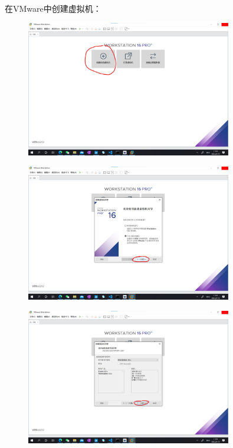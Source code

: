 \documentclass[UTF8]{ctexart}
\begin{document}
    在VMware中创建虚拟机：
    \begin{figure}[H]
        \centering
        \includegraphics[width=0.8\textwidth]{assets/u2.png}
    \end{figure}
    \begin{figure}[H]
        \centering
        \includegraphics[width=0.8\textwidth]{assets/u3.png}
    \end{figure}
    \begin{figure}[H]
        \centering
        \includegraphics[width=0.8\textwidth]{assets/u4.png}
    \end{figure}
\end{document}
